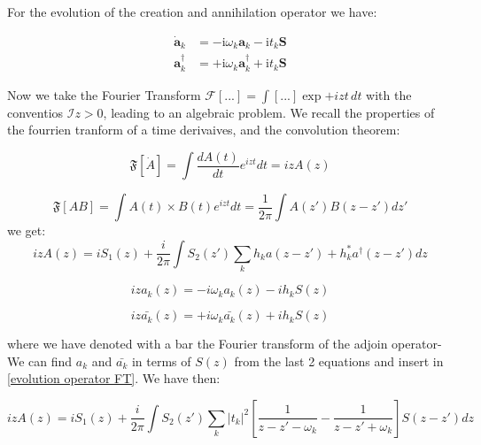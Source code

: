 \documentclass[%
preprint,
onecolumn,
notitlepag,
 amsmath,amssymb,
 aps,
 pra,
]{revtex4-2}
\begin{document}
\begin{itemize}
For the evolution of the creation and annihilation operator we have:



\begin{equation}
\begin{aligned}
\dot{\boldsymbol{a}}_{k} &=-\mathrm{i} \omega_{k} \boldsymbol{a}_{k}-\mathrm{i} t_{k} \boldsymbol{S} \\
\boldsymbol{a}_{k}^{\dagger} &=+\mathrm{i} \omega_{k} \boldsymbol{a}_{k}^{\dagger}+\mathrm{i} t_{k} \boldsymbol{S}
\end{aligned}
\end{equation}


Now we take the Fourier Transform $\mathcal{F} [...] = \int [...] \exp{+izt} \, dt $ with the conventios $\mathcal{I} z > 0 $, leading to an algebraic problem. We recall the properties of the fourrien tranform of a time derivaives, and the convolution theorem: 

\begin{equation}
\mathfrak{F} [\dot{A}]   =   \int \frac{dA(t)}{d t}  e^{izt} dt =iz A(z)
\end{equation}

\begin{equation}
 \mathfrak{F} [AB] =   \int A(t) \times B(t) e^{izt} dt = \frac{1}{2\pi} \int A(z') B(z-z') dz'
\end{equation}
we get:
\begin{equation}
izA(z)= i S_1 (z) + \frac{i}{2\pi} \int S_2(z') \sum_k h_k a(z-z')+ h_k^* a^{\dagger} (z-z') dz
\label{evolution operator FT}
\end{equation}

\begin{equation}
    iza_k(z) = -i\omega_k a_k(z) - ih_k S(z)
\end{equation}


\begin{equation}
    iz\bar{ a_k} (z) = +i\omega_k \bar{ a_k}(z) + ih_k S(z)
\end{equation}

where we have denoted with a bar the Fourier transform of the adjoin operator- We can find $a_k$ and $\bar{ a_k}$ in terms of $S(z)$ from the last 2 equations  and insert in \ref{evolution operator FT}. We have then: 


\begin{equation}
izA(z)= i S_1 (z) + \frac{i}{2\pi} \int S_2(z') \sum_k |t_k|^2 \left[ \frac{1}{z-z'-\omega_k} - \frac{1}{z-z'+\omega_k} \right]  S(z-z') dz
\label{evolution operator FT final}
\end{equation}


\end{itemize}
\end{document}
